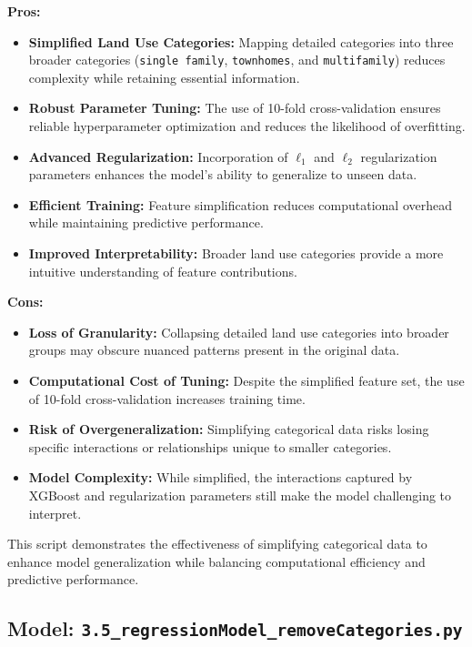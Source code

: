 \textbf{Pros:}
\begin{itemize}
    \item \textbf{Simplified Land Use Categories:} Mapping detailed categories into three broader categories (\texttt{single family}, \texttt{townhomes}, and \texttt{multifamily}) reduces complexity while retaining essential information.
    \item \textbf{Robust Parameter Tuning:} The use of 10-fold cross-validation ensures reliable hyperparameter optimization and reduces the likelihood of overfitting.
    \item \textbf{Advanced Regularization:} Incorporation of \(\ell_1\) and \(\ell_2\) regularization parameters enhances the model's ability to generalize to unseen data.
    \item \textbf{Efficient Training:} Feature simplification reduces computational overhead while maintaining predictive performance.
    \item \textbf{Improved Interpretability:} Broader land use categories provide a more intuitive understanding of feature contributions.
\end{itemize}

\textbf{Cons:}
\begin{itemize}
    \item \textbf{Loss of Granularity:} Collapsing detailed land use categories into broader groups may obscure nuanced patterns present in the original data.
    \item \textbf{Computational Cost of Tuning:} Despite the simplified feature set, the use of 10-fold cross-validation increases training time.
    \item \textbf{Risk of Overgeneralization:} Simplifying categorical data risks losing specific interactions or relationships unique to smaller categories.
    \item \textbf{Model Complexity:} While simplified, the interactions captured by XGBoost and regularization parameters still make the model challenging to interpret.
\end{itemize}

This script demonstrates the effectiveness of simplifying categorical data to enhance model generalization while balancing computational efficiency and predictive performance. \\

\hrulefill

\subsection{Model: \texttt{3.5\_regressionModel\_removeCategories.py}}

